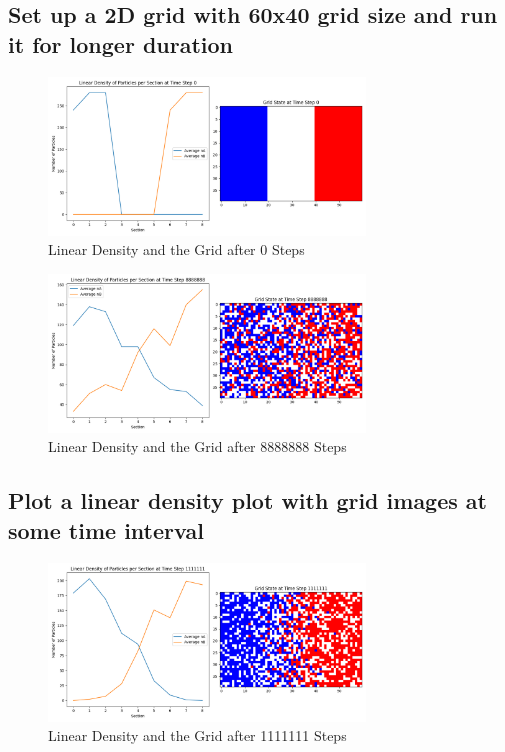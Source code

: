 \documentclass[11pt]{article}
\begin{document}
\subsection{ Set up a 2D grid with 60x40 grid size and run it for longer duration}
\begin{figure}[H]
    \centering
    \includegraphics[width=0.75\textwidth, keepaspectratio]{Linear_Density_Grid_After_0_Steps_1_Trial.png}
    \caption{Linear Density and the Grid after 0 Steps}
    \label{fig:21}
\end{figure}
\begin{figure}[H]
    \centering
    \includegraphics[width=0.75\textwidth, keepaspectratio]{Linear_Density_Grid_After_8888888_Steps_1_Trial.png}
    \caption{Linear Density and the Grid after 8888888 Steps}
    \label{fig:22}
\end{figure}

\subsection{Plot a linear density plot with grid images at some time interval}
\begin{figure}[H]
    \centering
    \includegraphics[width=0.75\textwidth, keepaspectratio]{Linear_Density_Grid_After_1111111_Steps_1_Trial.png}
    \caption{Linear Density and the Grid after 1111111 Steps}
    \label{fig:23}
\end{figure}
\end{document}
